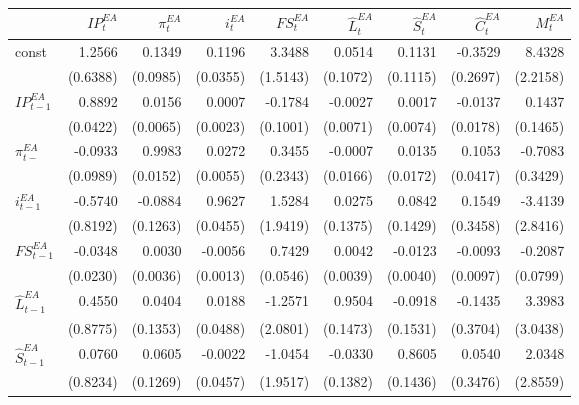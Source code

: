 \begin{sidewaystable}
    \centering
    \begin{tabular}{lrrrrrrrr}
        \toprule
        {} &        $IP^{EA}_{t}$ &   $\pi^{EA}_{t}$ &       $i^{EA}_{t}$ &       $FS^{EA}_{t}$ &         $\hat{L}^{EA}_{t}$ &         $\hat{S}^{EA}_{t}$ &         $\hat{C}^{EA}_{t}$ &   $M^{EA}_{t}$ \\
        \midrule
        const           &  1.2566 &   0.1349 &      0.1196 &  3.3488 &  0.0514 &  0.1131 & -0.3529 &    8.4328 \\
                &  (0.6388) &   (0.0985) &      (0.0355) &  (1.5143) &  (0.1072) &  (0.1115) &  (0.2697) &    (2.2158) \\
        $IP^{EA}_{t-1}$        &  0.8892 &   0.0156 &      0.0007 & -0.1784 & -0.0027 &  0.0017 & -0.0137 &    0.1437 \\
              &  (0.0422) &   (0.0065) &      (0.0023) &  (0.1001) &  (0.0071) &  (0.0074) &  (0.0178) &    (0.1465) \\
        $\pi^{EA}_{t-}$    & -0.0933 &   0.9983 &      0.0272 &  0.3455 & -0.0007 &  0.0135 &  0.1053 &   -0.7083 \\
            &  (0.0989) &   (0.0152) &      (0.0055) &  (0.2343) &  (0.0166) &  (0.0172) &  (0.0417) &    (0.3429) \\
        $i^{EA}_{t-1}$    & -0.5740 &  -0.0884 &      0.9627 &  1.5284 &  0.0275 &  0.0842 &  0.1549 &   -3.4139 \\
         &  (0.8192) &   (0.1263) &      (0.0455) &  (1.9419) &  (0.1375) &  (0.1429) &  (0.3458) &    (2.8416) \\
        $FS^{EA}_{t-1}$        & -0.0348 &   0.0030 &     -0.0056 &  0.7429 &  0.0042 & -0.0123 & -0.0093 &   -0.2087 \\
             &  (0.0230) &   (0.0036) &      (0.0013) &  (0.0546) &  (0.0039) &  (0.0040) &  (0.0097) &    (0.0799) \\
        $\hat{L}^{EA}_{t-1}$          &  0.4550 &   0.0404 &      0.0188 & -1.2571 &  0.9504 & -0.0918 & -0.1435 &    3.3983 \\
               &  (0.8775) &   (0.1353) &      (0.0488) &  (2.0801) &  (0.1473) &  (0.1531) &  (0.3704) &    (3.0438) \\
        $\hat{S}^{EA}_{t-1}$          &  0.0760 &   0.0605 &     -0.0022 & -1.0454 & -0.0330 &  0.8605 &  0.0540 &    2.0348 \\
               &  (0.8234) &   (0.1269) &      (0.0457) &  (1.9517) &  (0.1382) &  (0.1436) &  (0.3476) &    (2.8559) \\

\end{tabular}
\end{sidewaystable}
